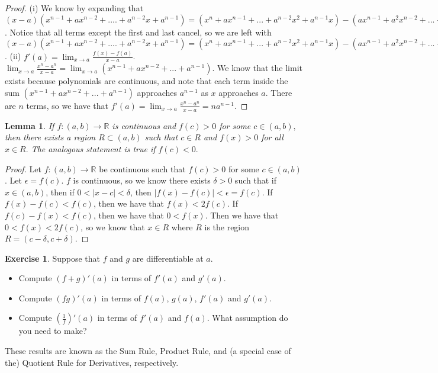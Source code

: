 \documentclass[12pt]{article}
\newcommand{\bbR}{\mathbb{R}}
\providecommand{\abs}[1]{\lvert #1 \rvert}
\providecommand{\sarr}{\rightarrow}
\renewcommand{\_}[1]{\underline{ #1 }}
\newtheorem{lemma}[theorem]{Lemma}
\theoremstyle{definition}
\newtheorem{exercise}[theorem]{Exercise}
\numberwithin{equation}{subsection}
\begin{document}
\begin{proof}
(i) We know by expanding that $(x-a)(x^{n-1} + ax^{n-2} +.... + a^{n-2}x + a^{n-1}) = (x^n + ax^{n-1} + ... + a^{n-2}x^2 + a^{n-1}x) - (ax^{n-1} + a^2x^{n-2} + ... + a^{n-1}x + a^n)$. Notice that all terms except the first and last cancel, so we are left with $(x-a)(x^{n-1} + ax^{n-2} +.... + a^{n-2}x + a^{n-1}) = (x^n + ax^{n-1} + ... + a^{n-2}x^2 + a^{n-1}x) - (ax^{n-1} + a^2x^{n-2} + ... + a^{n-1}x + a^n) = x^n - a^n$. \newline
(ii) $f'(a) = \lim_{x \to a}\frac{f(x) - f(a)}{x - a}$. $\lim_{x \to a}\frac{x^n-a^n}{x-a} = \lim_{x \to a}(x^{n-1} + ax^{n - 2} + ... + a^{n-1})$. We know that the limit exists because polynomials are continuous, and note that each term inside the sum $(x^{n-1} + ax^{n - 2} + ... + a^{n-1})$ approaches $a^{n-1}$ as $x$ approaches $a$. There are $n$ terms, so we have that $f'(a) = \lim_{x \to a}\frac{x^n-a^n}{x-a} = na^{n-1}$.
\end{proof}

\begin{lemma} If $f:(a,b)\sarr\bbR$ is continuous and $f(c)>0$ for some $c\in (a,b),$ then there exists a region $R\subset (a,b)$ such that $c\in R$ and $f(x)>0 $ for all $x\in R.$ The analogous statement is true if $f(c)<0.$
\end{lemma}

\begin{proof}
Let $f: (a,b) \to \bbR$ be continuous such that $f(c) > 0$ for some $c \in (a,b)$. Let $\epsilon = f(c)$. $f$ is continuous, so we know there exists $\delta > 0$ such that if $x \in (a,b)$, then if $0 < \abs{x - c} < \delta$, then $\abs{f(x) - f(c)} < \epsilon = f(c)$. If $f(x) - f(c) < f(c)$, then we have that $f(x) < 2f(c)$. If $f(c) - f(x) < f(c)$, then we have that $0 < f(x)$. Then we have that $0 < f(x) < 2f(c)$, so we know that $x \in R$ where $R$ is the region $R = (c - \delta, c + \delta)$.
\end{proof}

\begin{exercise} 

 Suppose that $f$ and $g$ are differentiable at $a$.  
\begin{itemize}
\item[(i)]  Compute $(f + g)'(a)$ in terms of $f'(a)$ and $g'(a)$.  
\item[(ii)]  Compute $(fg)'(a)$ in terms of $f(a)$, $g(a)$, $f'(a)$ and $g'(a)$.  
\item[(iii)] Compute $\left(\frac{1}{f}\right)'(a)$ in terms of $f'(a)$ and $f(a)$.  What assumption do you need to make? 
\end{itemize}
These results are known as the Sum Rule, Product Rule, and (a special case of the) Quotient Rule
for Derivatives, respectively.
\end{exercise}
\end{document}
